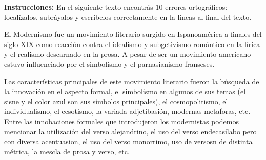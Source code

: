 \newpage

\textbf{Instrucciones: } En el siguiente texto encontrás $10$ errores ortográficos: localízalos, subráyalos y escríbelos correctamente en la líneas al final del texto.
\par
El Modernismo fue un movimiento literario surgido en Ispanoamérica a  finales del siglo XIX como reacción contra el idealismo y subgetivismo romántico en la lírica y el realismo descarnado en la prosa. A pesar de ser un movimiento americano estuvo influenciado por el simbolismo y el parnasianismo franseses.
\par
Las características principales de este movimiento literario fueron la búsqueda de la innovación en el aspecto formal, el simbolismo en algunos de sus temas (el sisne y el color azul son sus símbolos principales), el cosmopolitismo, el individualismo, el ecsotismo, la variada adjetibasión, modernas metaforas, etc. Entre las innobaciones formales que introdujeron los modernistas podemos mencionar la utilización del verso alejandrino, el uso del verso endecasílabo pero con diversa acentuasion, el uso del verso monorrimo, uso de versosn de distinta métrica, la mescla de prosa y verso, etc.


